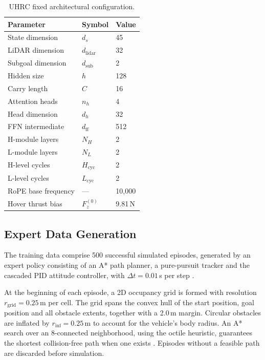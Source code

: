 \documentclass[12pt, a4paper]{article}
\begin{document}
\begin{table}[ht]
\centering
\caption{UHRC fixed architectural configuration.}
\label{tab:arch_config}
\begin{tabular}{lll}
\hline
Parameter & Symbol & Value \\
\hline
State dimension       & $d_s$               & 45 \\
LiDAR dimension       & $d_{\mathrm{lidar}}$& 32 \\
Subgoal dimension     & $d_{\mathrm{sub}}$  & 2 \\
Hidden size           & $h$                 & 128 \\
Carry length          & $C$                 & 16 \\
Attention heads       & $n_h$               & 4 \\
Head dimension        & $d_h$               & 32 \\
FFN intermediate      & $d_{\mathrm{ff}}$   & 512 \\
H-module layers       & $N_H$               & 2 \\
L-module layers       & $N_L$               & 2 \\
H-level cycles        & $H_{\mathrm{cyc}}$  & 2 \\
L-level cycles        & $L_{\mathrm{cyc}}$  & 2 \\
RoPE base frequency   & ---                 & 10{,}000 \\
Hover thrust bias     & $F_z^{(0)}$         & 9.81\,N \\
\hline
\end{tabular}
\end{table}


\subsection{Expert Data Generation}
\label{sec:datagen}


The training data comprise 500 successful simulated episodes, generated by an expert policy consisting of an A* path planner, a pure-pursuit tracker and the cascaded PID attitude controller, with $\Delta t = 0.01$\,s per step \parencite{levine_end--end_2016, le_mero_survey_2022}.


At the beginning of each episode, a 2D occupancy grid is formed with resolution $r_{\mathrm{grid}} = 0.25$\,m per cell.
The grid spans the convex hull of the start position, goal position and all obstacle extents, together with a 2.0\,m margin.
Circular obstacles are inflated by $r_{\mathrm{inf}} = 0.25$\,m to account for the vehicle's body radius.
An A* search over an 8-connected neighborhood, using the octile heuristic, guarantees the shortest collision-free path when one exists \parencite{zhou_review_2021}.
Episodes without a feasible path are discarded before simulation.
\end{document}
